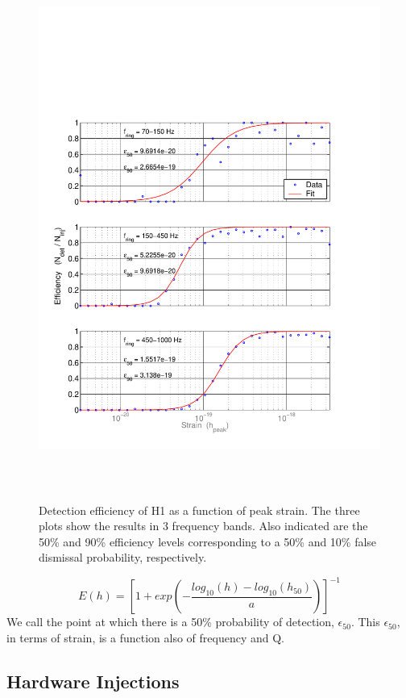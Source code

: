 \begin{figure}[!h]
\centerline{\includegraphics[angle=0,height=7in]{Figures/Chap7/eff-H1.pdf}}
\caption[H1 Detection Efficiency]{Detection efficiency of H1 as a function of peak strain. 
         The three plots show the results in 3 frequency bands. Also indicated are the 
         50\% and 90\% efficiency levels
         corresponding to a 50\% and 10\% false dismissal probability, respectively.}
\label{fig:H1efficiency}
\end{figure}

\begin{equation}
E(h) = \left[1 + exp(-\frac{log_{10}(h)-log_{10}(h_{50})}{a})\right]^{-1}
\end{equation}
We call the point at which there is a 50\% probability of detection,
$\epsilon_{50}$. This $\epsilon_{50}$, in terms of strain, is a function also
of frequency and Q.


\subsection{Hardware Injections}
\label{sec:HI}

